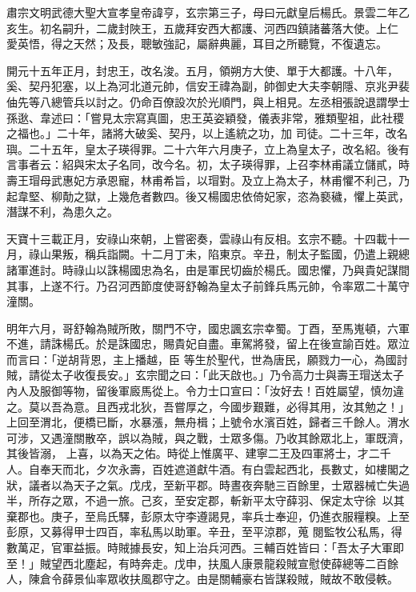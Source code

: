 
\begin{pinyinscope}

 肅宗文明武德大聖大宣孝皇帝諱亨，玄宗第三子，母曰元獻皇后楊氏。景雲二年乙亥生。初名嗣升，二歲封陜王，五歲拜安西大都護、河西四鎮諸蕃落大使。上仁
 愛英悟，得之天然；及長，聰敏強記，屬辭典麗，耳目之所聽覽，不復遺忘。



 開元十五年正月，封忠王，改名浚。五月，領朔方大使、單于大都護。十八年，奚、契丹犯塞，以上為河北道元帥，信安王禕為副，帥御史大夫李朝隱、京兆尹裴伷先等八總管兵以討之。仍命百僚設次於光順門，與上相見。左丞相張說退謂學士孫逖、韋述曰：「嘗見太宗寫真圖，忠王英姿穎發，儀表非常，雅類聖祖，此社稷之福也。」二十年，諸將大破奚、契丹，以上遙統之功，加
 司徒。二十三年，改名璵。二十五年，皇太子瑛得罪。二十六年六月庚子，立上為皇太子，改名紹。後有言事者云：紹與宋太子名同，改今名。初，太子瑛得罪，上召李林甫議立儲貳，時壽王瑁母武惠妃方承恩寵，林甫希旨，以瑁對。及立上為太子，林甫懼不利己，乃起韋堅、柳勣之獄，上幾危者數四。後又楊國忠依倚妃家，恣為褻穢，懼上英武，潛謀不利，為患久之。



 天寶十三載正月，安祿山來朝，上嘗密奏，雲祿山有反相。玄宗不聽。十四載十一
 月，祿山果叛，稱兵詣闕。十二月丁未，陷東京。辛丑，制太子監國，仍遣上親總諸軍進討。時祿山以誅楊國忠為名，由是軍民切齒於楊氏。國忠懼，乃與貴妃謀間其事，上遂不行。乃召河西節度使哥舒翰為皇太子前鋒兵馬元帥，令率眾二十萬守潼關。



 明年六月，哥舒翰為賊所敗，關門不守，國忠諷玄宗幸蜀。丁酉，至馬嵬頓，六軍不進，請誅楊氏。於是誅國忠，賜貴妃自盡。車駕將發，留上在後宣諭百姓。眾泣而言曰：「逆胡背恩，主上播越，臣
 等生於聖代，世為唐民，願戮力一心，為國討賊，請從太子收復長安。」玄宗聞之曰：「此天啟也。」乃令高力士與壽王瑁送太子內人及服御等物，留後軍廄馬從上。令力士口宣曰：「汝好去！百姓屬望，慎勿違之。莫以吾為意。且西戎北狄，吾嘗厚之，今國步艱難，必得其用，汝其勉之！」上回至渭北，便橋已斷，水暴漲，無舟楫；上號令水濱百姓，歸者三千餘人。渭水可涉，又遇潼關散卒，誤以為賊，與之戰，士眾多傷。乃收其餘眾北上，軍既濟，其後皆溺，
 上喜，以為天之佑。時從上惟廣平、建寧二王及四軍將士，才二千人。自奉天而北，夕次永壽，百姓遮道獻牛酒。有白雲起西北，長數丈，如樓閣之狀，議者以為天子之氣。戊戌，至新平郡。時晝夜奔馳三百餘里，士眾器械亡失過半，所存之眾，不過一旅。己亥，至安定郡，斬新平太守薛羽、保定太守徐，以其棄郡也。庚子，至烏氏驛，彭原太守李遵謁見，率兵士奉迎，仍進衣服糧糗。上至彭原，又募得甲士四百，率私馬以助軍。辛丑，至平涼郡，蒐
 閱監牧公私馬，得數萬疋，官軍益振。時賊據長安，知上治兵河西。三輔百姓皆曰：「吾太子大軍即至！」賊望西北塵起，有時奔走。戊申，扶風人康景龍殺賊宣慰使薛總等二百餘人，陳倉令薛景仙率眾收扶風郡守之。由是關輔豪右皆謀殺賊，賊故不敢侵軼。




\end{pinyinscope}
